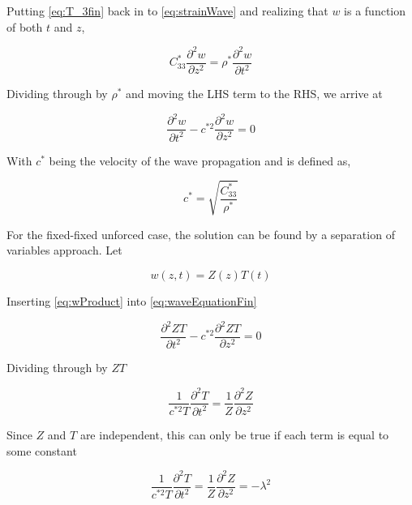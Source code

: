 Putting \ref{eq:T_3fin} back in to \ref{eq:strainWave} and realizing that $w$ is a function of both $t$ and $z$,

\begin{equation}
C^*_{33}\frac{\partial ^2w}{\partial z^2} = \rho^* \frac{\partial ^2w}{\partial t^2}
\end{equation}

Dividing through by $\rho^*$ and moving the LHS term to the RHS, we arrive at

\begin{equation}
\frac{\partial ^2w}{\partial t^2} - c^{*2} \frac{\partial ^2w}{\partial z^2} = 0
\label{eq:waveEquationFin}
\end{equation}


With $c^*$ being the velocity of the wave propagation and is defined as,

\begin{equation}
c^* = \sqrt{\frac{C^*_{33}}{\rho^*}}
\end{equation}

For the fixed-fixed unforced case, the solution can be found by a separation of variables approach. Let 

\begin{equation}
w(z,t) = Z(z)T(t)
\label{eq:wProduct}
\end{equation}

Inserting \ref{eq:wProduct} into \ref{eq:waveEquationFin}

\begin{equation}
\frac{\partial ^2ZT}{\partial t^2} - c^{*2} \frac{\partial ^2ZT}{\partial z^2} = 0
\label{eq:waveEquationSub}
\end{equation}

Dividing through by $ZT$

\begin{equation}
\frac{1}{c^{*2}T}\frac{\partial ^2T}{\partial t^2} =  \frac{1}{Z}\frac{\partial ^2Z}{\partial z^2}
\label{eq:waveEquationDiv}
\end{equation}

Since $Z$ and $T$ are independent, this can only be true if each term is equal to some constant

\begin{equation}
\frac{1}{c^{*2}T}\frac{\partial ^2T}{\partial t^2} =  \frac{1}{Z}\frac{\partial ^2Z}{\partial z^2} = -\lambda ^2
\label{eq:waveEquationConst}
\end{equation}

